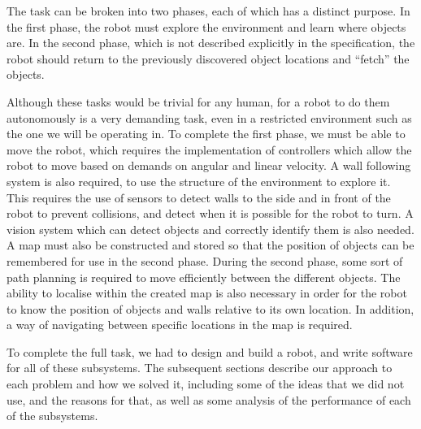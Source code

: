 The task can be broken into two phases, each of which has a distinct purpose. In
the first phase, the robot must explore the environment and learn where objects
are. In the second phase, which is not described explicitly in the
specification, the robot should return to the previously discovered object
locations and ``fetch'' the objects.

Although these tasks would be trivial for any human, for a robot to do them
autonomously is a very demanding task, even in a restricted environment such as
the one we will be operating in. To complete the first phase, we must be able to
move the robot, which requires the implementation of controllers which allow the
robot to move based on demands on angular and linear velocity. A wall following
system is also required, to use the structure of the environment to explore it.
This requires the use of sensors to detect walls to the side and in front of the
robot to prevent collisions, and detect when it is possible for the robot to
turn. A vision system which can detect objects and correctly identify them is
also needed. A map must also be constructed and stored so that the position of
objects can be remembered for use in the second phase. During the second phase,
some sort of path planning is required to move efficiently between the different
objects. The ability to localise within the created map is also necessary in
order for the robot to know the position of objects and walls relative to its
own location. In addition, a way of navigating between specific locations in the
map is required.

To complete the full task, we had to design and build a robot, and write
software for all of these subsystems. The subsequent sections describe our
approach to each problem and how we solved it, including some of the ideas that
we did not use, and the reasons for that, as well as some analysis of the
performance of each of the subsystems.


